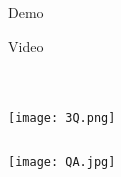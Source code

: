 \documentclass[xcolor=table,compress,blue]{beamer}
\begin{document}
\subsection{}
\begin{frame}{Demo}
	\begin{exampleblock}{Video}
	\end{exampleblock}
\end{frame}



\section{}
\begin{frame}[plain]
	\thispagestyle{empty}
	\begin{columns}
		\begin{column}{\paperwidth}
			\texttt{[image: 3Q.png]}
		\end{column}
	\end{columns}
\end{frame}

\begin{frame}[plain]
	\thispagestyle{empty}
	\begin{columns}
		\begin{column}{\paperwidth}
			\texttt{[image: QA.jpg]}
		\end{column}
	\end{columns}
\end{frame}
\end{document}
